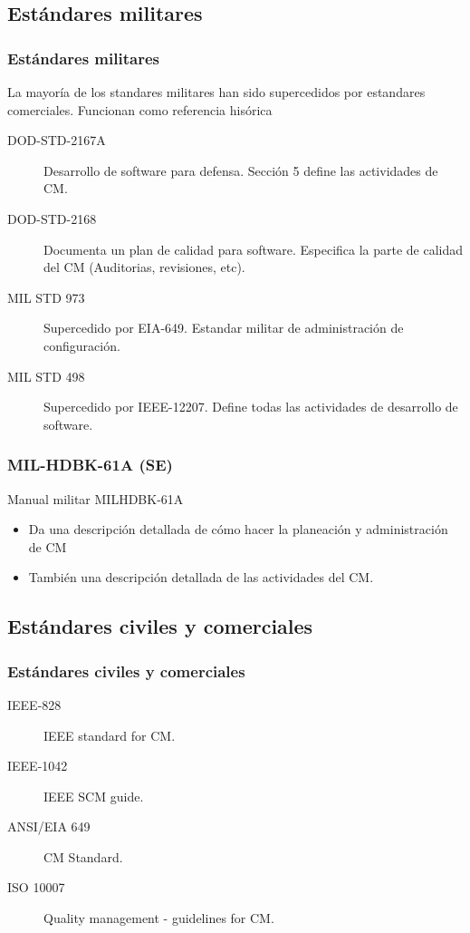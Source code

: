 \subsection{Est\'andares militares}
\begin{frame}
	\frametitle{Est\'andares militares}
	La mayor\'ia de los standares militares han sido supercedidos por 
	estandares comerciales. Funcionan como referencia his\'orica
	\begin{description}
		\item[DOD-STD-2167A] Desarrollo de software para defensa. Secci\'on 5 define las actividades de CM.
		\item[DOD-STD-2168] Documenta un plan de calidad para software. Especifica la parte de calidad del CM (Auditorias, revisiones, etc). 
		\item[MIL STD 973] Supercedido por EIA-649. Estandar militar de administraci\'on de configuraci\'on.
		\item[MIL STD 498] Supercedido por IEEE-12207. Define todas las actividades de desarrollo de software. 
	\end{description}
\end{frame}
\begin{frame}
	\frametitle{MIL-HDBK-61A (SE)}
	Manual militar MILHDBK-61A
	\begin{itemize}
		\item Da una descripci\'on detallada de c\'omo hacer 
			la planeaci\'on y administraci\'on de CM
		\item Tambi\'en una descripci\'on detallada de las actividades 
			del CM. 
	\end{itemize}
\end{frame}
\subsection{Est\'andares civiles y comerciales}
\begin{frame}
	\frametitle{Est\'andares civiles y comerciales}
	\begin{description}
		\item[IEEE-828] IEEE standard for CM. 
		\item[IEEE-1042] IEEE SCM guide. 
		\item[ANSI/EIA 649] CM Standard. 
		\item[ISO 10007] Quality management - guidelines for CM. 
	\end{description}
\end{frame}
